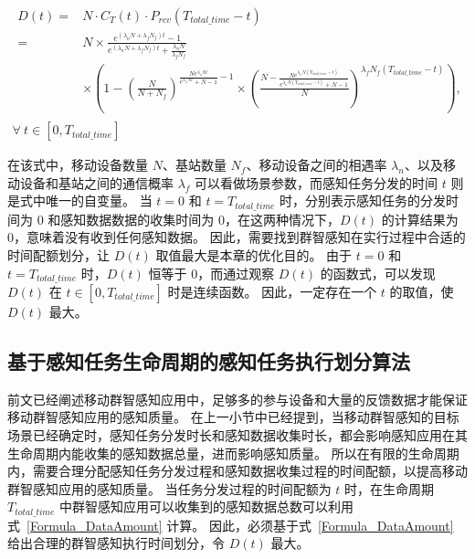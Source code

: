 \vspace{-2.5em}
\begin{equation}
  \label{Formula_DataAmount}
  \begin{gathered}
    \begin{aligned}
      D(t) = &N \cdot C_T(t) \cdot P_{rcv}(T_{total\_time}-t)\\
      = &N \times \frac{e^{(\lambda_n N + \lambda_f N_f) t} - 1}{e^{(\lambda_n N + \lambda_f N_f) t} + \frac{\lambda_n N}{\lambda_f N_f}} \\
      &\times (1 -  (\frac{N}{N + N_f})^{\frac{N e^{\lambda_n N t}}{e^{\lambda_n N t} + N -1} - 1} \times (\frac{N-\frac{N e^{\lambda_n N (T_{total\_time} - t)}}{e^{\lambda_n N (T_{total\_time} - t)} + N -1}}{N})^{\lambda_f N_f (T_{total\_time} - t)}),
    \end{aligned}\\
    \forall \ t \in [0, T_{total\_time}]
  \end{gathered}
\end{equation}

在该式中，移动设备数量 $N$、基站数量 $N_f$、移动设备之间的相遇率 $\lambda_n$、以及移动设备和基站之间的通信概率 $\lambda_f$ 可以看做场景参数，而感知任务分发的时间 $t$ 则是式中唯一的自变量。
当 $t = 0$ 和 $t = T_{total\_time}$ 时，分别表示感知任务的分发时间为 0 和感知数据数据的收集时间为 0，在这两种情况下，$D(t)$ 的计算结果为0，意味着没有收到任何感知数据。
因此，需要找到群智感知在实行过程中合适的时间配额划分，让 $D(t)$ 取值最大是本章的优化目的。
由于 $t = 0$ 和 $t = T_{total\_time}$ 时，$D(t)$ 恒等于 $0$，而通过观察 $D(t)$ 的函数式，可以发现 $D(t)$ 在 $ t \in [0, T_{total\_time}] $ 时是连续函数。
因此，一定存在一个 $t$ 的取值，使 $D(t)$ 最大。

\subsection{基于感知任务生命周期的感知任务执行划分算法}
\label{UIC:algo}


前文已经阐述移动群智感知应用中，足够多的参与设备和大量的反馈数据才能保证移动群智感知应用的感知质量。
在上一小节中已经提到，当移动群智感知的目标场景已经确定时，感知任务分发时长和感知数据收集时长，都会影响感知应用在其生命周期内能收集的感知数据总量，进而影响感知质量。
所以在有限的生命周期内，需要合理分配感知任务分发过程和感知数据收集过程的时间配额，以提高移动群智感知应用的感知质量。
当任务分发过程的时间配额为 $t$ 时，在生命周期 $T_{total\_time}$ 中群智感知应用可以收集到的感知数据总数可以利用式~\eqref{Formula_DataAmount} 计算。
因此，必须基于式~\eqref{Formula_DataAmount} 给出合理的群智感知执行时间划分，令 $D(t)$ 最大。


